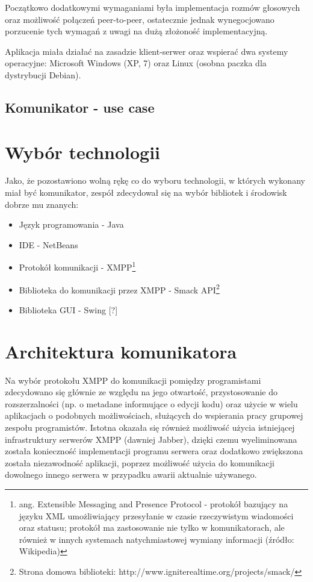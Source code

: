 \documentclass[polish,11pt,a4paper,twoside]{article}
\begin{document}
Początkowo dodatkowymi wymaganiami była implementacja rozmów głosowych oraz możliwość połączeń peer-to-peer, ostatecznie jednak wynegocjowano porzucenie tych wymagań z uwagi na dużą złożoność implementacyjną.

Aplikacja miała działać na zasadzie klient-serwer oraz wspierać dwa systemy operacyjne: Microsoft Windows (XP, 7) oraz Linux (osobna paczka dla dystrybucji Debian).

\subsection{Komunikator - use case}

\section{Wybór technologii}

Jako, że pozostawiono wolną rękę co do wyboru technologii, w których wykonany miał być komunikator, zespół zdecydował się na wybór bibliotek i środowisk dobrze mu znanych:
\begin{itemize}
\item Język programowania - Java
\item IDE - NetBeans
\item Protokół komunikacji - XMPP\footnote{ang. Extensible Messaging and Presence Protocol - protokół bazujący na języku XML umożliwiający przesyłanie w czasie rzeczywistym wiadomości oraz statusu; protokół ma zastosowanie nie tylko w komunikatorach, ale również w innych systemach natychmiastowej wymiany informacji (źródło: Wikipedia)}
\item Biblioteka do komunikacji przez XMPP - Smack API\footnote{Strona domowa biblioteki: http://www.igniterealtime.org/projects/smack/}
\item Biblioteka GUI - Swing [?]
\end{itemize}

\section{Architektura komunikatora}

Na wybór protokołu XMPP do komunikacji pomiędzy programistami zdecydowano się głównie ze względu na jego otwartość, przystosowanie do rozszerzalności (np. o metadane informujące o edycji kodu) oraz użycie w wielu aplikacjach o podobnych możliwościach, służących do wspierania pracy grupowej zespołu programistów. Istotna okazała się również możliwość użycia istniejącej infrastruktury serwerów XMPP (dawniej Jabber), dzięki czemu wyeliminowana została konieczność implementacji programu serwera oraz dodatkowo zwiększona została niezawodność aplikacji, poprzez możliwość użycia do komunikacji dowolnego innego serwera w przypadku awarii aktualnie używanego.
\end{document}
